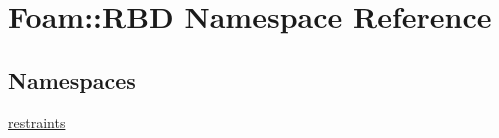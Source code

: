 \hypertarget{namespaceFoam_1_1RBD}{}\section{Foam\+:\+:R\+BD Namespace Reference}
\label{namespaceFoam_1_1RBD}
\subsection*{Namespaces}
\begin{DoxyCompactItemize}
\item 
 \hyperlink{namespaceFoam_1_1RBD_1_1restraints}{restraints}
\end{DoxyCompactItemize}
